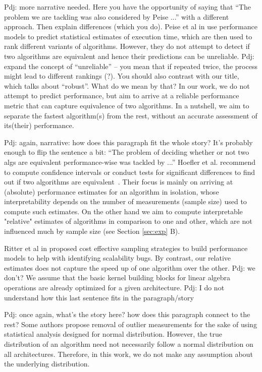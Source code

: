 \documentclass[conference]{IEEEtran}
\newcommand{\p}[1]{{\color{blue} Pdj: #1}}
\begin{document}
\p{more narrative needed. Here you have the opportunity of saying that ``The problem we are tackling was also considered
  by Peise ...'' with a different approach. Then explain differences (which you do).}  
Peise et al in \cite{peise2012performance} use performance models to predict statistical estimates of execution time,
which are then used to rank different variants of algorithms. However, they do not attempt to detect if two algorithms
are equivalent and hence their predictions can be unreliable. \p{expand the concept of ``unreliable'' -- you mean that
  if repeated twice, the process might lead to different rankings (?). You should also contrast with our title, which
  talks about ``robust''. What do we mean by that?}
In our work, we do not attempt to predict performance, but aim to arrive at a reliable performance metric that can
capture equivalence of two algorithms. In a nutshell, we aim to separate the fastest algorithm(s) from the rest, without
an accurate assessment of its(their) performance.

\p{again, narrative: how does this paragraph fit the whole story? It's probably enough to flip the sentence a bit:
``The problem of deciding whether or not two algs are equivalent performance-wise was tackled by ...''}
Hoefler et al. recommend to compute confidence intervals or conduct tests for significant differences to find out if two
algorithms are equivalent~\cite{hoefler2015scientific}. Their focus is mainly on arriving at (absolute) performance estimates for an algorithm in isolation, whose interpretability depends on the number of measurements (sample size) used to compute such estimates. On the other hand we aim to compute interpretable "relative" estimates of algorithms in comparison to one and other, which are not influenced much by sample size (see Section \ref{sec:exp} B).
 
 Ritter et al in \cite{ritter2020learning} proposed cost effective sampling strategies to build performance models to
 help with identifying scalability bugs. By contrast, our relative estimates does not capture the speed up of one
 algorithm over the other. \p{we don't?} We assume that the basic kernel building blocks for linear algebra operations
 are already optimized for a given architecture. \p{I do not understand how this last sentence fits in the paragraph/story}

 \p{once again, what's the story here? how does this paragraph connect to the rest?}
 Some authors \cite{outlierremoval} \cite{androbench} propose removal of outlier measurements for the sake of using statistical analysis designed for normal distribution. However, the true distribution of an algorithm need not necessarily follow a normal distribution on all architectures. Therefore, in this work, we do not make any assumption about the underlying distribution. 
\end{document}
